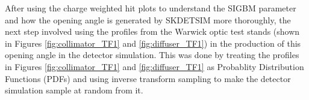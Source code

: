 After using the charge weighted hit plots to understand the SIGBM parameter and how the opening angle is generated by SKDETSIM more thoroughly, the next step involved using the profiles from the Warwick optic test stands (shown in Figures \ref{fig:collimator_TF1} and \ref{fig:diffuser_TF1}) in the production of this opening angle in the detector simulation. This was done by treating the profiles in Figures \ref{fig:collimator_TF1} and \ref{fig:diffuser_TF1} as Probablity Distribution Functions (PDFs) and using inverse transform sampling to make the detector simulation sample at random from it. 